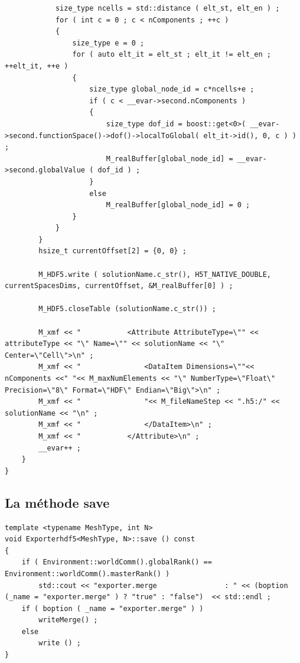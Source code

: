 \documentclass[12pt]{article}
\begin{document}
\begin{lstlisting}
            size_type ncells = std::distance ( elt_st, elt_en ) ;
            for ( int c = 0 ; c < nComponents ; ++c )
            {
                size_type e = 0 ;
                for ( auto elt_it = elt_st ; elt_it != elt_en ; ++elt_it, ++e )
                {
                    size_type global_node_id = c*ncells+e ;
                    if ( c < __evar->second.nComponents )
                    {
                        size_type dof_id = boost::get<0>( __evar->second.functionSpace()->dof()->localToGlobal( elt_it->id(), 0, c ) ) ;
                        M_realBuffer[global_node_id] = __evar->second.globalValue ( dof_id ) ;
                    }
                    else 
                        M_realBuffer[global_node_id] = 0 ;
                }
            }
        }   
        hsize_t currentOffset[2] = {0, 0} ;

        M_HDF5.write ( solutionName.c_str(), H5T_NATIVE_DOUBLE, currentSpacesDims, currentOffset, &M_realBuffer[0] ) ;

        M_HDF5.closeTable (solutionName.c_str()) ;    

        M_xmf << "           <Attribute AttributeType=\"" << attributeType << "\" Name=\"" << solutionName << "\" Center=\"Cell\">\n" ;
        M_xmf << "               <DataItem Dimensions=\""<< nComponents <<" "<< M_maxNumElements << "\" NumberType=\"Float\" Precision=\"8\" Format=\"HDF\" Endian=\"Big\">\n" ;
        M_xmf << "               "<< M_fileNameStep << ".h5:/" << solutionName << "\n" ;
        M_xmf << "               </DataItem>\n" ;    
        M_xmf << "           </Attribute>\n" ;
        __evar++ ;
    }
}
\end{lstlisting}
\newpage
\subsection {La méthode save}
\begin{lstlisting}
template <typename MeshType, int N>
void Exporterhdf5<MeshType, N>::save () const 
{
    if ( Environment::worldComm().globalRank() == Environment::worldComm().masterRank() )
        std::cout << "exporter.merge                : " << (boption (_name = "exporter.merge" ) ? "true" : "false")  << std::endl ;
    if ( boption ( _name = "exporter.merge" ) )
        writeMerge() ;
    else 
        write () ;
}
\end{lstlisting}
\newpage
\end{document}
